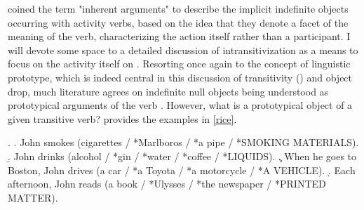 \textcite[122]{vanvalinlapolla1997syntax} coined the term "inherent arguments" to describe the implicit indefinite objects occurring with activity verbs, based on the idea that they denote a facet of the meaning of the verb, characterizing the action itself rather than a participant. I will devote some space to a detailed discussion of intransitivization as a means to focus on the activity itself on . Resorting once again to the concept of linguistic prototype, which is indeed central in this discussion of transitivity () and object drop, much literature agrees on indefinite null objects being understood as prototypical arguments of the verb \parencite{Rice1988, Naess2007, bresnan1978realistic, Melchin2019, Mittwoch2005, Dvorak2017thesis, Levin1993, Lorenzetti2008, quirk1985grammar}. However, what is a prototypical object of a given transitive verb? \textcite[204]{Rice1988} provides the examples in \ref{rice}.

\ex. \label{rice} \a. \label{rice1} John smokes (cigarettes / *Marlboros / *a pipe / *SMOKING MATERIALS).
\b. \label{rice2} John drinks (alcohol / *gin / *water / *coffee / *LIQUIDS).
\c. \label{rice3} When he goes to Boston, John drives (a car / *a Toyota / *a motorcycle / *A VEHICLE).
\d. \label{rice4} Each afternoon, John reads (a book / *Ulysses / *the newspaper / *PRINTED MATTER).

